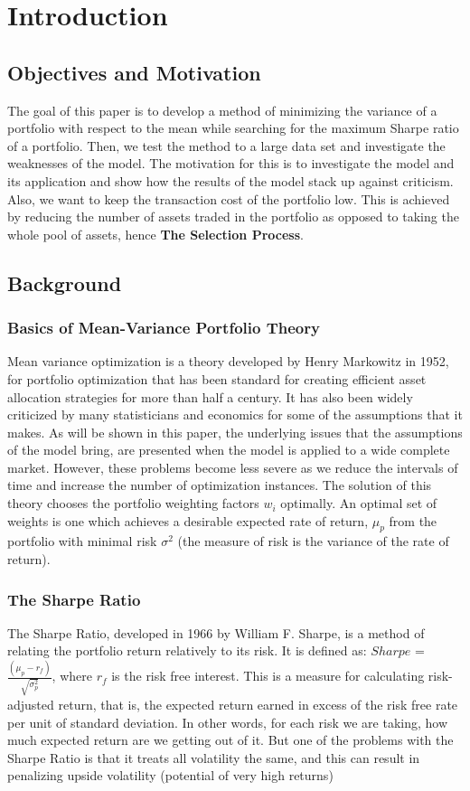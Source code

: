 \documentclass[12pt]{article}
\begin{document}
\section{Introduction}
\subsection{Objectives and Motivation}
The goal of this paper is to develop a method of minimizing the variance of a portfolio with respect to the mean while searching for the maximum Sharpe ratio of a portfolio. Then, we test the method to a large data set and investigate the weaknesses of the model. The motivation for this is to investigate the model and its application and show how the results of the model stack up against criticism. Also, we want to keep the transaction cost of the portfolio low. This is achieved by reducing the number of assets traded in the portfolio as opposed to taking the whole pool of assets, hence \textbf{The Selection Process}. \\ 
\subsection{Background}
\subsubsection{Basics of Mean-Variance Portfolio Theory}
Mean variance optimization is a theory developed by Henry Markowitz in 1952, for portfolio optimization that has been standard for creating efficient asset allocation strategies for more than half a century. It has also been widely criticized by many statisticians and economics for some of the assumptions that it makes. As will be shown in this paper, the underlying issues that the assumptions of the model bring, are presented when the model is applied to a wide complete market. However, these problems become less severe as we reduce the intervals of time and increase the number of optimization instances. The solution of this theory chooses the portfolio weighting factors $w_i$ optimally. An optimal set of weights is one which achieves a desirable expected rate of return, $\mu_p$ from the portfolio with minimal risk $\sigma^2$ (the measure of risk is the variance of the rate of return).  \\

\subsubsection{The Sharpe Ratio}
The Sharpe Ratio, developed in 1966 by William F. Sharpe, is a method of relating the portfolio return relatively to its risk. It is defined as: $Sharpe$ = $\frac{(\mu_p - r_f)}{\sqrt{\sigma_p^2}}$, where $r_f$ is the risk free interest.  This is a measure for calculating risk-adjusted return, that is, the expected return earned in excess of the risk free rate per unit of standard deviation. In other words, for each risk we are taking, how much expected return are we getting out of it. But one of the problems with the Sharpe Ratio is that it treats all volatility the same, and this can result in penalizing upside volatility (potential of very high returns)\\
\end{document}
